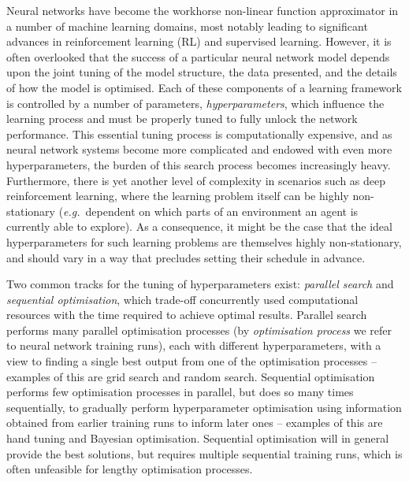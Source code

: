\documentclass{article} %
\def\eg{\emph{e.g.}}
\begin{document}
Neural networks have become the workhorse non-linear function approximator in a number of machine learning domains, most notably leading to significant advances in reinforcement learning (RL) and supervised learning. 
%
However, it is often overlooked that the success of a particular neural network model depends upon the joint tuning of the model structure, the data presented, and the details of how the model is optimised. Each of these components of a learning framework is controlled by a number of parameters, \emph{hyperparameters}, which influence the learning process and must be properly tuned to fully unlock the network performance.
%
This essential tuning process is computationally expensive, and as neural network systems become more complicated and endowed with even more hyperparameters, the burden of this search process becomes increasingly heavy. 
Furthermore, there is yet another level of complexity in scenarios such as deep reinforcement learning, where the learning problem itself can be highly non-stationary (\eg~dependent on which parts of an environment an agent is currently able to explore). As a consequence, it might be the case that the ideal hyperparameters for such learning problems are themselves highly non-stationary, and should vary in a way that precludes setting their schedule in advance.

Two common tracks for the tuning of hyperparameters exist: \emph{parallel search} and \emph{sequential optimisation}, which trade-off concurrently used computational resources with the time required to achieve optimal results. 
%
Parallel search performs many parallel optimisation processes (by \emph{optimisation process} we refer to neural network training runs), each with different hyperparameters, with a view to finding a single best output from one of the optimisation processes -- examples of this are grid search and random search. 
%
Sequential optimisation performs few optimisation processes in parallel, but does so many times sequentially, to gradually perform hyperparameter optimisation using information obtained from earlier training runs to inform later ones -- examples of this are hand tuning and Bayesian optimisation. Sequential optimisation will in general provide the best solutions, but requires multiple sequential training runs, which is often unfeasible for lengthy optimisation processes.
\end{document}
